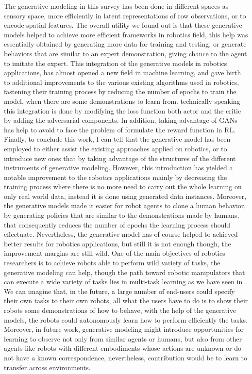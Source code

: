 The generative modeling in this survey has been done in different spaces as sensory space, more efficiently in latent representations of row observations, or to encode spatial features. The overall utility we found out is that these generative models helped to achieve more efficient frameworks in robotics field, this help was essentially obtained by generating more data for training and testing, or generate behaviors that are similar to an expert demonstration, giving chance to the agent to imitate the expert. This integration of the generative models in robotics applications, has almost opened a new field in machine learning, and gave birth to additional improvements to the various existing algorithms used in robotics, fastening their training process by reducing the number of epochs to train the model, when there are some demonstrations to learn from. technically speaking this integration is done by modifying the loss function both actor and the critic by adding the adversarial components. In addition, taking advantage of GANs has help to avoid to face the problem of formulate the reward function in RL. Finally, to conclude this work, I can tell that the generative model has been employed to either assist the existing approaches applied on robotics, or to introduce new ones that by taking advantage of the structures of the different instruments of generative modeling. However, this introduction has yielded a notable improvement to the robotics applications mainly by decreasing the training process where there is no more need to carry out the whole learning on only real world data, instead it is done using generated data instances. Moreover, the generative models made it easier for robot agents to clone a human behavior, by generating policies that are similar to the demonstrations made by humans, that consequently reduces the number of epochs the learning process should effectuate. Nevertheless, the generative model has of course helped to achieved better results for robotics applications, but still it is not enough though, the improvement margins are still wild. One of the main objectives of robotics researchers is to achieve robots able to perform wild variety of tasks, the generative modeling can help, though the path toward robotic manipulators that can execute a wide variety of tasks lies in multi-task learning as we have seen in~\cite{rahmatizadeh2018vision}. We can imagine that, in the future, a large number of end-users could specify their own tasks to their own robots, all what the users have to do is to show their robots some demonstrations of how to behave, with the help of the generative models, the robots could autonomously learn how to perform efficiently the tasks. Moreover, in future work, generative modeling might introduce opportunities for learning to observe not only from similar agents or humans, but also from other agents like robots with different embodiments whose actions are unknown or do not have a known correspondence, nevertheless, contribution would be to learn to transfer across environments.
\clearpage{\pagestyle{empty}\cleardoublepage}